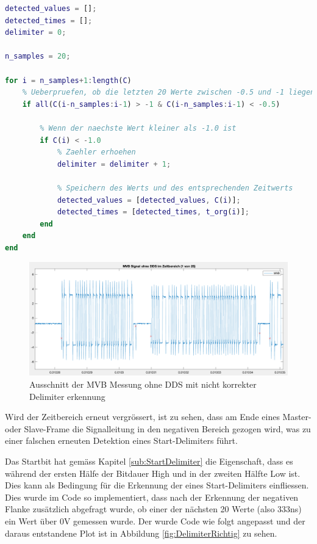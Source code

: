 \begin{lstlisting}[language=Matlab]
detected_values = [];
detected_times = [];
delimiter = 0;

n_samples = 20;

for i = n_samples+1:length(C)
    % Ueberpruefen, ob die letzten 20 Werte zwischen -0.5 und -1 liegen
    if all(C(i-n_samples:i-1) > -1 & C(i-n_samples:i-1) < -0.5)

        % Wenn der naechste Wert kleiner als -1.0 ist
        if C(i) < -1.0
            % Zaehler erhoehen
            delimiter = delimiter + 1;
                
            % Speichern des Werts und des entsprechenden Zeitwerts
            detected_values = [detected_values, C(i)];
            detected_times = [detected_times, t_org(i)];
        end
    end
end
\end{lstlisting}

\begin{figure}[H]
    \centering
    \includegraphics[width=0.9\linewidth]{Figures/Chap3/Busauslastung/Ausschnitt_MVB_Delimiter_falsch.png}
    \caption{Ausschnitt der MVB Messung ohne DDS mit nicht korrekter Delimiter erkennung}
    \label{fig:MVBDelimiterFalsch}
\end{figure}

Wird der Zeitbereich erneut vergrössert, ist zu sehen, dass am Ende eines Master- oder Slave-Frame die Signalleitung in den negativen Bereich gezogen wird, was zu einer falschen erneuten Detektion eines Start-Delimiters führt.

Das Startbit hat gemäss Kapitel \ref{sub:StartDelimiter} die Eigenschaft, dass es während der ersten Hälfe der Bitdauer High und in der zweiten Hälfte Low ist. Dies kann als Bedingung für die Erkennung der eines Start-Delimiters einfliessen. Dies wurde im Code so implementiert, dass nach der Erkennung der negativen Flanke zusätzlich abgefragt wurde, ob einer der nächsten 20 Werte (also 333ns) ein Wert über 0V gemessen wurde. Der wurde Code wie folgt angepasst und der daraus entstandene Plot ist in Abbildung \ref{fig:DelimiterRichtig} zu sehen.

